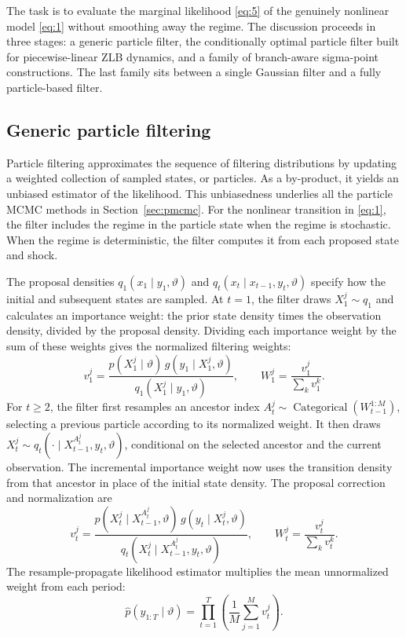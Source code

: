 \documentclass[11pt]{article}
\begin{document}
The task is to evaluate the marginal likelihood \eqref{eq:5} of the genuinely nonlinear model \eqref{eq:1} without smoothing away the regime. The discussion proceeds in three stages: a generic particle filter, the conditionally optimal particle filter built for piecewise-linear ZLB dynamics, and a family of branch-aware sigma-point constructions. The last family sits between a single Gaussian filter and a fully particle-based filter.

\subsection{Generic particle filtering}
\label{sec:pf-generic}

Particle filtering approximates the sequence of filtering distributions by
updating a weighted collection of sampled states, or particles. As a
by-product, it yields an unbiased estimator of the likelihood. This
unbiasedness underlies all the particle MCMC methods in
Section~\ref{sec:pmcmc}. For the nonlinear transition in
\eqref{eq:1}, the filter includes the regime in the particle
state when the regime is stochastic. When the regime is deterministic, the
filter computes it from each proposed state and shock.

The proposal densities $q_1(x_1\mid y_1,\vartheta)$ and
$q_t(x_t\mid x_{t-1},y_t,\vartheta)$ specify how the initial and subsequent
states are sampled. At $t=1$, the filter draws
$X_1^j\sim q_1$ and calculates an importance weight: the
prior state density times the observation density, divided by the proposal
density. Dividing each importance weight by the sum of these weights gives
the normalized filtering weights:
\begin{equation}\label{eq:12a}
 v_1^j=\frac{p(X_1^j\mid\vartheta)\,g(y_1\mid X_1^j,\vartheta)}
 {q_1(X_1^j\mid y_1,\vartheta)},\qquad
 W_1^j=\frac{v_1^j}{\sum_k v_1^k}.
\end{equation}
For $t\geq2$, the filter first resamples an ancestor
index $A_t^j\sim\operatorname{Categorical}(W_{t-1}^{1:M})$, selecting a previous particle
according to its normalized weight. It then draws
$X_t^j\sim q_t(\cdot\mid X_{t-1}^{A_t^j},y_t,\vartheta)$, conditional on the selected ancestor
and the current observation. The incremental importance weight now uses the
transition density from that ancestor in place of the initial state density.
The proposal correction and normalization are
\begin{equation}\label{eq:12b}
 v_t^j=\frac{p(X_t^j\mid X_{t-1}^{A_t^j},\vartheta)\,
                  g(y_t\mid X_t^j,\vartheta)}
 {q_t(X_t^j\mid X_{t-1}^{A_t^j},y_t,\vartheta)},\qquad
 W_t^j=\frac{v_t^j}{\sum_kv_t^k}.
\end{equation}
The resample-propagate likelihood estimator multiplies the mean unnormalized
weight from each period:
\begin{equation}\label{eq:13}
 \widehat p(y_{1:T}\mid\vartheta)=
 \prod_{t=1}^T\left(\frac1M\sum_{j=1}^M v_t^j\right).
\end{equation}
\end{document}
